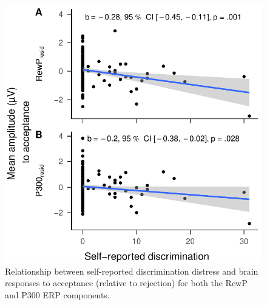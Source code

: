 \documentclass[
  man,floatsintext]{apa7}
\begin{document}
\begin{figure}
\centering
\includegraphics{BUDS_tables_and_figures_working_files/figure-latex/unnamed-chunk-18-1.pdf}
\caption{\label{fig:unnamed-chunk-18}Relationship between self-reported discrimination distress and brain responses to acceptance (relative to rejection) for both the RewP and P300 ERP components.}
\end{figure}
\end{document}
